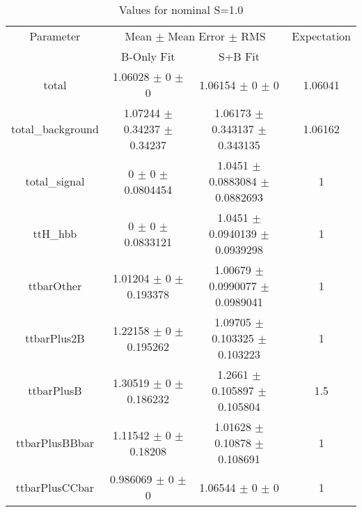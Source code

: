 \begin{table}
\centering
\caption{Values for nominal S=1.0}
\begin{tabular}{cccc}
\toprule
Parameter & \multicolumn{2}{c}{Mean $\pm$ Mean Error $\pm$ RMS} & Expectation\\
 & B-Only Fit & S+B Fit & \\
\midrule
total & \num{1.06028} $\pm$ \num{0} $\pm$ \num{0} & \num{1.06154} $\pm$ \num{0} $\pm$ \num{0} & \num{1.06041}\\
total\_background & \num{1.07244} $\pm$ \num{0.34237} $\pm$ \num{0.34237} & \num{1.06173} $\pm$ \num{0.343137} $\pm$ \num{0.343135} & \num{1.06162}\\
total\_signal & \num{0} $\pm$ \num{0} $\pm$ \num{0.0804454} & \num{1.0451} $\pm$ \num{0.0883084} $\pm$ \num{0.0882693} & \num{1}\\
ttH\_hbb & \num{0} $\pm$ \num{0} $\pm$ \num{0.0833121} & \num{1.0451} $\pm$ \num{0.0940139} $\pm$ \num{0.0939298} & \num{1}\\
ttbarOther & \num{1.01204} $\pm$ \num{0} $\pm$ \num{0.193378} & \num{1.00679} $\pm$ \num{0.0990077} $\pm$ \num{0.0989041} & \num{1}\\
ttbarPlus2B & \num{1.22158} $\pm$ \num{0} $\pm$ \num{0.195262} & \num{1.09705} $\pm$ \num{0.103325} $\pm$ \num{0.103223} & \num{1}\\
ttbarPlusB & \num{1.30519} $\pm$ \num{0} $\pm$ \num{0.186232} & \num{1.2661} $\pm$ \num{0.105897} $\pm$ \num{0.105804} & \num{1.5}\\
ttbarPlusBBbar & \num{1.11542} $\pm$ \num{0} $\pm$ \num{0.18208} & \num{1.01628} $\pm$ \num{0.10878} $\pm$ \num{0.108691} & \num{1}\\
ttbarPlusCCbar & \num{0.986069} $\pm$ \num{0} $\pm$ \num{0} & \num{1.06544} $\pm$ \num{0} $\pm$ \num{0} & \num{1}\\
\bottomrule
\end{tabular}
\end{table}